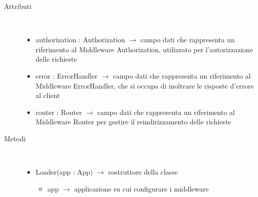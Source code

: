 \begin{description}
\item[Attributi] \hfill \\
\vspace{-7mm}
\begin{itemize}
	\item authorization : Authorization $\rightarrow$ campo dati che rappresenta un riferimento al Middleware Authorization, utilizzato per l'autorizzazione delle richieste
	\item error : ErrorHandler $\rightarrow$ campo dati che rappresenta un riferimento al Middleware ErrorHandler, che si occupa di inoltrare le risposte d'errore al client
	\item router : Router $\rightarrow$ campo dati che rappresenta un riferimento al Middleware Router per gestire il reindirizzamento delle richieste
\end{itemize}

\item[Metodi] \hfill \\
\vspace{-7mm}
\begin{itemize}
	\item Loader(app : App) $\rightarrow$ costruttore della classe\begin{itemize}
		\item app $\rightarrow$ applicazione su cui configurare i middleware
	\end{itemize}
	
\end{itemize}

\end{description}

\vspace{0.5cm}
\hypertarget{server::middleware::ErrorHandler}{}
